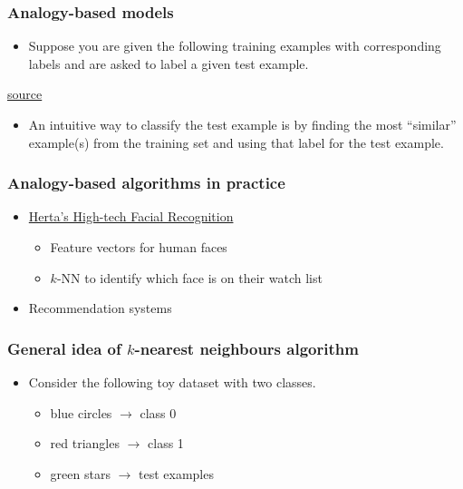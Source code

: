 \documentclass[11pt]{article}
\providecommand{\tightlist}{%
      \setlength{\itemsep}{0pt}\setlength{\parskip}{0pt}}
\begin{document}
    \subsubsection{Analogy-based models}\label{analogy-based-models}

\begin{itemize}
\tightlist
\item
  Suppose you are given the following training examples with
  corresponding labels and are asked to label a given test example.
\end{itemize}

\href{https://vipl.ict.ac.cn/en/database.php}{source}

\begin{itemize}
\tightlist
\item
  An intuitive way to classify the test example is by finding the most
  ``similar'' example(s) from the training set and using that label for
  the test example.
\end{itemize}

    \subsubsection{Analogy-based algorithms in
practice}\label{analogy-based-algorithms-in-practice}

\begin{itemize}
\tightlist
\item
  \href{https://www.hertasecurity.com/en}{Herta's High-tech Facial
  Recognition}

  \begin{itemize}
  \tightlist
  \item
    Feature vectors for human faces
  \item
    \(k\)-NN to identify which face is on their watch list
  \end{itemize}
\item
  Recommendation systems
\end{itemize}

    \subsubsection{\texorpdfstring{General idea of \(k\)-nearest neighbours
algorithm}{General idea of k-nearest neighbours algorithm}}\label{general-idea-of-k-nearest-neighbours-algorithm}

\begin{itemize}
\tightlist
\item
  Consider the following toy dataset with two classes.

  \begin{itemize}
  \tightlist
  \item
    blue circles \(\rightarrow\) class 0
  \item
    red triangles \(\rightarrow\) class 1
  \item
    green stars \(\rightarrow\) test examples
  \end{itemize}
\end{itemize}
\end{document}

